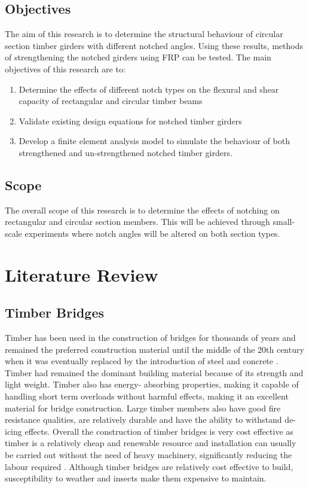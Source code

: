 \documentclass[11pt,a4paper]{article}
\numberwithin{equation}{subsection}
\begin{document}
	
	\subsection{Objectives}
	The aim of this research is to determine the structural behaviour of circular section timber girders with different notched angles. Using these results, methods of strengthening the notched girders using FRP can be tested. The main objectives of this research are to:\par 
	
	\begin{enumerate}
		\item Determine the effects of different notch types on the flexural and shear capacity of rectangular and circular timber beams
		\item Validate existing design equations for notched timber girders
		\item Develop a finite element analysis model to simulate the behaviour of both strengthened and un-strengthened notched timber girders.
	\end{enumerate}
	
	\subsection{Scope}
	\noindent
	The overall scope of this research is to determine the effects of notching on rectangular and circular section members. This will be achieved through small-scale experiments where notch angles will be altered on both section types.
	
	\pagebreak
	
	\section{Literature Review}
	
	\subsection{Timber Bridges}
	Timber has been used in the construction of bridges for thousands of years \cite{ritter_timber_1990} and remained the preferred construction material until the middle of the 20th century when it was eventually replaced by the introduction of steel and concrete \cite{ritter_timber_1990,_timber_2005} . Timber had remained the dominant building material because of its strength and light weight. Timber also has energy- absorbing properties, making it capable of handling short term overloads without harmful effects, making it an excellent material for bridge construction. Large timber members also have good fire resistance qualities, are relatively durable and have the ability to withstand de-icing effects. Overall the construction of timber bridges is very cost effective as timber is a relatively cheap and renewable resource and installation can usually be carried out without the need of heavy machinery, significantly reducing the labour required \cite{ritter_timber_1990}. Although timber bridges are relatively cost effective to build, susceptibility to weather and insects make them expensive to maintain.
	
\end{document}
